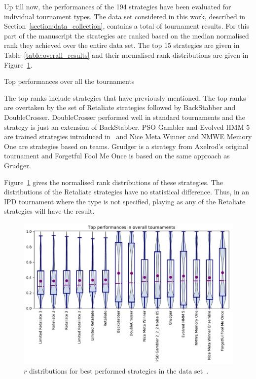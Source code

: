 \documentclass{article}
\newcommand{\numberofalltournaments}{}
\begin{document}
Up till now, the performances of the 194 strategies have been evaluated for
individual tournament types. The data set considered in this work, described in
Section~\ref{section:data_collection}, contains a total of \numberofalltournaments
tournament results. For this part of the manuscript the strategies are ranked
based on the median normalised rank they achieved over the entire data set.
The top 15 strategies are given in Table~\ref{table:overall_results}
and their normalised rank distributions are given in Figure~\ref{fig:overall_results}.

\begin{table}[!htbp]
    \centering
    \resizebox{.35\textwidth}{!}{
    }
    \caption{Top performances over all the tournaments}\label{table:overall_results}
\end{table}

The top ranks include strategies that have previously mentioned. The top ranks
are overtaken by the set of Retaliate strategies followed by BackStabber and
DoubleCrosser. DoubleCrosser performed well in standard tournaments and the
strategy is just an extension of BackStabber. PSO Gambler and Evolved HMM 5 are
trained strategies introduced in~\cite{Harper2017} and Nice Meta Winner and NMWE
Memory One are strategies based on teams. Grudger is a strategy from Axelrod's
original tournament and Forgetful Fool Me Once is based on the same approach as
Grudger.

Figure~\ref{fig:overall_results} gives the normalised rank distributions of
these strategies. The distributions of the Retaliate strategies have no
statistical difference. Thus, in an IPD tournament where the type is not
specified, playing as any of the Retaliate strategies will have the result.

\begin{figure}[!htbp]
    \centering
    \includegraphics[width=.55\textwidth]{../images/performance_merged.pdf}
    \caption{\(r\) distributions for best performed strategies in the data set~\cite{data}.}
    \label{fig:overall_results}
\end{figure}
\end{document}
